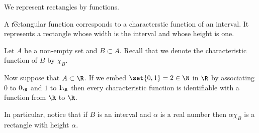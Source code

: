 

We represent rectangles by functions.


A \t{rectangular function} corresponds to a characterstic function of an interval.
It represents a rectangle whose width is the interval and whose height is one.


Let $A$ be a non-empty
set and $B \subset A$.
Recall that we denote the characteristic function of $B$ by $\chi_{B}$.

Now suppose that $A \subset \R$.
If we embed $\set{0, 1} = 2 \in \N$ in $\R$ by associating $0$ to $0_{\R}$ and $1$ to $1_{\R}$
then every characteristic function is identifiable with a function from $\R$ to $\R$.

In particular, notice that if $B$ is an interval
and
$\alpha$ is a real number
then $\alpha \chi_{B}$ is
a rectangle with
height $\alpha$.

\blankpage
